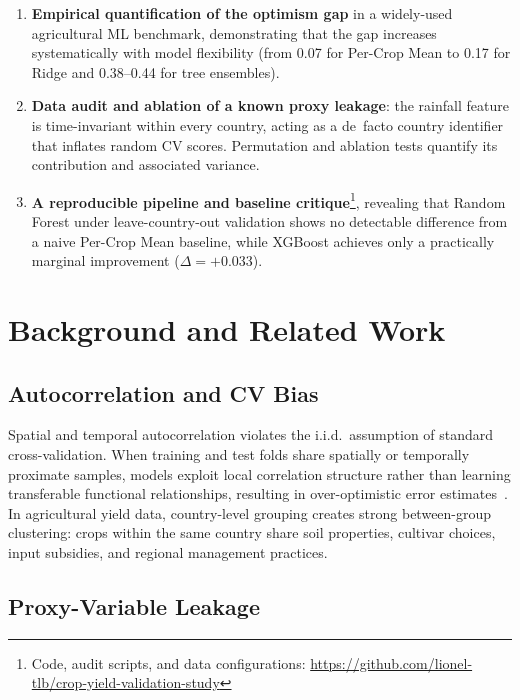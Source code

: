 \documentclass[conference]{IEEEtran}
\begin{document}
\begin{enumerate}
    \item \textbf{Empirical quantification of the optimism gap} in a 
    widely-used agricultural ML benchmark, demonstrating that the gap 
    increases systematically with model flexibility (from 0.07 for Per-Crop Mean 
    to 0.17 for Ridge and 0.38--0.44 for tree ensembles).
    
    \item \textbf{Data audit and ablation of a known proxy leakage}: the 
    rainfall feature is time-invariant within every country, acting as a 
    de~facto country identifier that inflates random CV scores. Permutation 
    and ablation tests quantify its contribution and associated variance.
    
    \item \textbf{A reproducible pipeline and baseline critique}\footnote{Code, 
    audit scripts, and data configurations: 
    \url{https://github.com/lionel-tlb/crop-yield-validation-study}}, 
    revealing that Random Forest under leave-country-out validation shows no 
    detectable difference from a naive Per-Crop Mean baseline, while XGBoost 
    achieves only a practically marginal improvement ($\Delta = +0.033$).
\end{enumerate}

\section{Background and Related Work}
\label{sec:background}

\subsection{Autocorrelation and CV Bias}

Spatial and temporal autocorrelation violates the i.i.d.\ assumption of 
standard cross-validation. When training and test folds share spatially or 
temporally proximate samples, models exploit local correlation structure 
rather than learning transferable functional relationships, resulting in 
over-optimistic error estimates~\cite{roberts2017cross}. In agricultural 
yield data, country-level grouping creates strong between-group clustering: 
crops within the same country share soil properties, cultivar choices, input 
subsidies, and regional management practices.

\subsection{Proxy-Variable Leakage}
\end{document}

